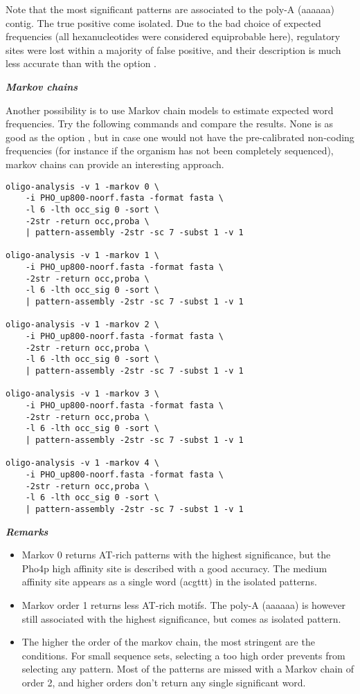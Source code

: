 Note that the most significant patterns are associated to the poly-A
(aaaaaa) contig. The true positive come isolated. Due to the bad
choice of expected frequencies (all hexanucleotides were considered
equiprobable here), regulatory sites were lost within a majority of
false positive, and their description is much less accurate than with
the option .

\textit{\textbf{Markov chains}}

Another possibility is to use Markov chain models to estimate expected
word frequencies. Try the following commands and compare the
results. None is as good as the option ,
but in case one would not have the pre-calibrated non-coding
frequencies (for instance if the organism has not been completely
sequenced), markov chains can provide an interesting approach.

{\color{Blue} \begin{footnotesize} 
\begin{verbatim}
oligo-analysis -v 1 -markov 0 \
    -i PHO_up800-noorf.fasta -format fasta \
    -l 6 -lth occ_sig 0 -sort \
    -2str -return occ,proba \
    | pattern-assembly -2str -sc 7 -subst 1 -v 1

oligo-analysis -v 1 -markov 1 \
    -i PHO_up800-noorf.fasta -format fasta \
    -2str -return occ,proba \
    -l 6 -lth occ_sig 0 -sort \
    | pattern-assembly -2str -sc 7 -subst 1 -v 1
	
oligo-analysis -v 1 -markov 2 \
    -i PHO_up800-noorf.fasta -format fasta \
    -2str -return occ,proba \
    -l 6 -lth occ_sig 0 -sort \
    | pattern-assembly -2str -sc 7 -subst 1 -v 1
	
oligo-analysis -v 1 -markov 3 \
    -i PHO_up800-noorf.fasta -format fasta \
    -2str -return occ,proba \
    -l 6 -lth occ_sig 0 -sort \
    | pattern-assembly -2str -sc 7 -subst 1 -v 1
	
oligo-analysis -v 1 -markov 4 \
    -i PHO_up800-noorf.fasta -format fasta \
    -2str -return occ,proba \
    -l 6 -lth occ_sig 0 -sort \
    | pattern-assembly -2str -sc 7 -subst 1 -v 1
\end{verbatim} \end{footnotesize}
}


\textit{\textbf{Remarks}}
\begin{itemize}
\item 
Markov 0 returns AT-rich patterns with the highest significance, but
the Pho4p high affinity site is described with a good accuracy. The
medium affinity site appears as a single word (acgttt) in the isolated
patterns.
\item 
Markov order 1 returns less AT-rich motifs. The poly-A (aaaaaa) is
however still associated with the highest significance, but comes as
isolated pattern.
\item 
The higher the order of the markov chain, the most stringent are the
conditions. For small sequence sets, selecting a too high order
prevents from selecting any pattern. Most of the patterns are missed
with a Markov chain of order 2, and higher orders don't return any
single significant word.
\end{itemize}

